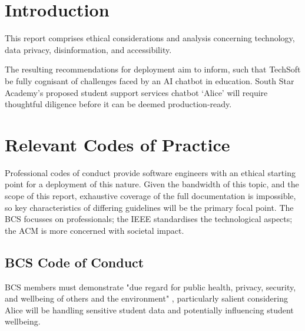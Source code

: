 \documentclass[14pt,a4paper]{article}
\begin{document}
\thispagestyle{empty}

\newpage

\tableofcontents
{}

\newpage


\begin{multicols}{2}
\section{Introduction}
This report comprises ethical considerations and analysis concerning technology, data privacy, disinformation, and accessibility.

The resulting recommendations for deployment aim to inform, such that TechSoft be fully cognisant of challenges faced by an AI chatbot in education.
South Star Academy's proposed student support services chatbot `Alice' will require thoughtful diligence before it can be deemed production-ready.





\section{Relevant Codes of Practice}
Professional codes of conduct provide software engineers with an ethical starting point for a deployment of this nature.
Given the bandwidth of this topic, and the scope of this report, exhaustive coverage of the full documentation is impossible, so key characteristics of differing guidelines will be the primary focal point.
The BCS focusses on professionals; the IEEE standardises the technological aspects; the ACM is more concerned with societal impact.

\subsection{BCS Code of Conduct}
BCS members must demonstrate "due regard for public health, privacy, security, and wellbeing of others and the environment" \textit{\parencite[p. 2]{BCS2024}}, particularly salient considering Alice will be handling sensitive student data and potentially influencing student wellbeing.


\end{multicols}
\end{document}
